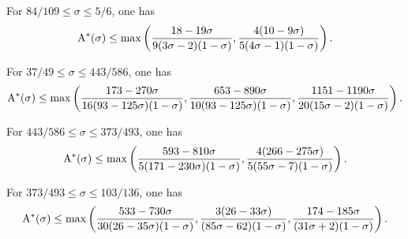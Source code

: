 \begin{theorem}\label{imp-energy-bound8}
For $84/109 \le \sigma \le 5/6$, one has
\[
\mathrm{A}^*(\sigma) \le \max\left(\frac{18 - 19\sigma}{9(3\sigma - 2)(1 - \sigma)}, \frac{4(10 - 9\sigma)}{5(4\sigma - 1)(1 - \sigma)}\right).
\]
\end{theorem}
\derived
{}


\begin{theorem}\label{imp-energy-bound9}
For $37/49 \le \sigma \le 443/586$, one has
\[
\mathrm{A}^*(\sigma)\le \max\left(\frac{173 - 270\sigma}{16(93 - 125\sigma)(1-\sigma)}, \frac{653 - 890\sigma}{10(93 - 125\sigma)(1-\sigma)}, \frac{1151 - 1190\sigma}{20(15\sigma - 2)(1-\sigma)}\right).
\]
\end{theorem}



\begin{theorem}\label{imp-energy-bound10}
For $443/586 \le \sigma \le 373/493$, one has
\[
\mathrm{A}^*(\sigma)\le \max\left(\frac{593 - 810\sigma}{5(171 - 230\sigma)(1-\sigma)}, \frac{4(266 - 275\sigma)}{5(55\sigma - 7)(1-\sigma)}\right).
\]
\end{theorem}


\begin{theorem}\label{imp-energy-bound11}
For $373/493 \le \sigma \le 103/136$, one has
\[
\mathrm{A}^*(\sigma)\le \max\left(\frac{533 - 730\sigma}{30(26 - 35\sigma)(1-\sigma)}, \frac{3(26 - 33\sigma)}{(85\sigma - 62)(1-\sigma)}, \frac{174 - 185\sigma}{(31\sigma + 2)(1-\sigma)}\right).
\]
\end{theorem}


